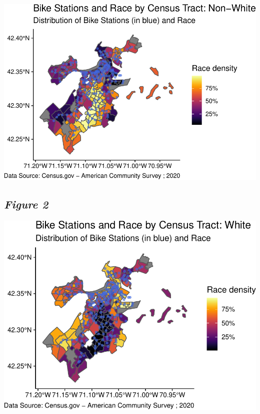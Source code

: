 \documentclass[
  12pt,
]{article}
\begin{document}
\begin{longtable}[]
\begin{flushleft}\includegraphics{Project_Template_files/figure-latex/develop plots race non-white-1} \end{flushleft}
\newpage

\hypertarget{figure-2}{%
\subsection{\texorpdfstring{\emph{Figure 2}}{Figure 2}}\label{figure-2}}

\begin{flushleft}\includegraphics{Project_Template_files/figure-latex/develop plots race white-1} \end{flushleft}

\newpage


\end{longtable}
\end{document}
